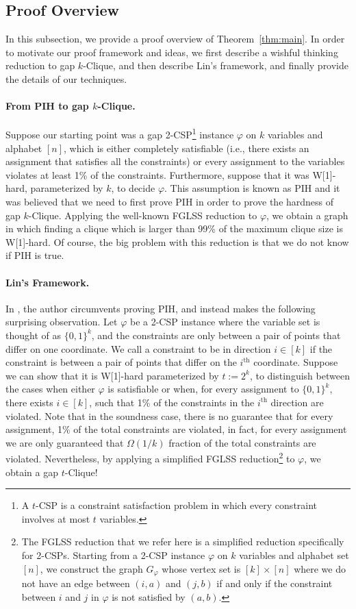 \documentclass[11pt]{article}
\begin{document}
 \subsection{Proof Overview}\label{sec:overview}
 In this subsection, we provide a proof overview of Theorem~\ref{thm:main}. In order to motivate our proof framework and ideas, we first describe a wishful thinking reduction to gap $k$-Clique, and then describe Lin's framework, and finally provide the details of our techniques.  
 
 \paragraph{From PIH to gap $k$-Clique.} Suppose our starting point was a gap 2-CSP\footnote{A $t$-CSP is a constraint satisfaction problem in which every constraint involves at most $t$ variables.} instance $\varphi$ on $k$ variables and alphabet $[n]$, which is either completely satisfiable (i.e., there exists an assignment that satisfies all the constraints) or every assignment to the variables violates at least 1\% of the constraints.  Furthermore, suppose that  it was W[1]-hard, parameterized by $k$, to decide $\varphi$. This assumption is known as PIH and it was believed \cite{CGG06} that we need to first prove PIH in order to prove the hardness of gap $k$-Clique. Applying the well-known FGLSS reduction to $\varphi$, we 
 obtain a graph in which finding a clique which is larger than 99\% of the maximum clique size is W[1]-hard. Of course, the big problem with this reduction is that we do not know if PIH is true. 


\paragraph{Lin's Framework.} In \cite{L21}, the author circumvents proving PIH, and instead makes the following surprising observation. Let $\varphi$ be a 2-CSP  instance where the variable set is thought of as $\{0,1\}^k$, and the constraints are only between a pair of points that differ  on one coordinate. We call a constraint to be in direction $i\in[k]$ if the constraint is between a pair of points that differ on the $i^{\text{th}}$ coordinate. Suppose we can show that it is W[1]-hard parameterized by $t:=2^k$, to distinguish between the cases when either $\varphi$ is satisfiable or when, for every assignment to $\{0,1\}^k$, there exists $i\in[k]$, such that 1\% of the constraints in the $i^{\text{th}}$ direction are violated. Note that in the soundness case, there is no guarantee that for every  assignment, 1\% of the total constraints are violated, in fact, for every  assignment we are only guaranteed that  $\Omega(1/k)$ fraction of the total constraints are violated. 
Nevertheless, by applying a simplified FGLSS reduction\footnote{The FGLSS reduction that we refer here is a simplified reduction specifically for 2-CSPs. Starting from a 2-CSP instance $\varphi$ on $k$ variables and alphabet set $[n]$, we construct the graph $G_{\varphi}$ whose vertex set is $[k]\times [n]$ where we do not have an edge between $(i,a)$ and $(j,b)$ if and only if the constraint between $i$ and $j$ in $\varphi$ is not satisfied by $(a,b)$.} to $\varphi$, we obtain a gap $t$-Clique! 
\end{document}
